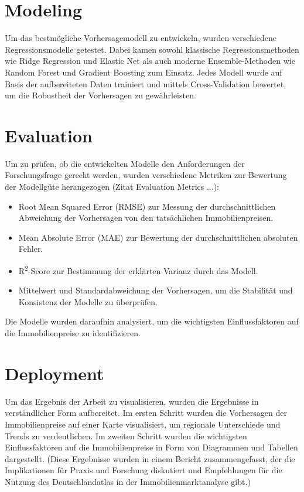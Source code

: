 \section*{Modeling}
Um das bestmögliche Vorhersagemodell zu entwickeln, wurden verschiedene Regressionsmodelle getestet. Dabei kamen sowohl klassische Regressionsmethoden wie Ridge Regression und Elastic Net als auch moderne Ensemble-Methoden wie Random Forest und Gradient Boosting zum Einsatz. Jedes Modell wurde auf Basis der aufbereiteten Daten trainiert und mittels Cross-Validation bewertet, um die Robustheit der Vorhersagen zu gewährleisten.

\section*{Evaluation}
Um zu prüfen, ob die entwickelten Modelle den Anforderungen der Forschungsfrage gerecht werden, wurden verschiedene Metriken zur Bewertung der Modellgüte herangezogen (Zitat Evaluation Metrics ...):
\begin{itemize}
    \item Root Mean Squared Error (RMSE) zur Messung der durchschnittlichen Abweichung der Vorhersagen von den tatsächlichen Immobilienpreisen.
    \item Mean Absolute Error (MAE) zur Bewertung der durchschnittlichen absoluten Fehler.
    \item R\textsuperscript{2}-Score zur Bestimmung der erklärten Varianz durch das Modell.
    \item Mittelwert und Standardabweichung der Vorhersagen, um die Stabilität und Konsistenz der Modelle zu überprüfen.
\end{itemize}

Die Modelle wurden daraufhin analysiert, um die wichtigsten Einflussfaktoren auf die Immobilienpreise zu identifizieren.

\section*{Deployment}
Um das Ergebnis der Arbeit zu visualisieren, wurden die Ergebnisse in verständlicher Form aufbereitet. Im ersten Schritt wurden die Vorhersagen der Immobilienpreise auf einer Karte visualisiert, um regionale Unterschiede und Trends zu verdeutlichen. Im zweiten Schritt wurden die wichtigsten Einflussfaktoren auf die Immobilienpreise in Form von Diagrammen und Tabellen dargestellt. (Diese Ergebnisse wurden in einem Bericht zusammengefasst, der die Implikationen für Praxis und Forschung diskutiert und Empfehlungen für die Nutzung des Deutschlandatlas in der Immobilienmarktanalyse gibt.)